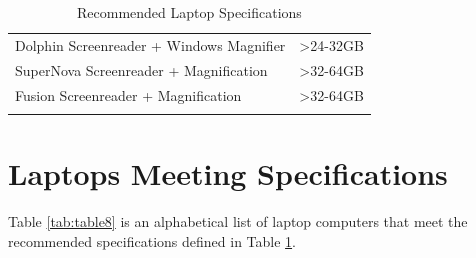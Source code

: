 \begin{longtable}[]{@{}
	>{\raggedright\arraybackslash}m{}
	>{\raggedright\arraybackslash}b{}@{}
	}
	Dolphin Screenreader + Windows Magnifier                                                                                                                                                                                                                                         & \textgreater24-32GB \\[1.0em]
	SuperNova Screenreader + Magnification                                                                                                                                                                                                                                           & \textgreater32-64GB \\[1.0em]
	Fusion Screenreader + Magnification                                                                                                                                                                                                                                              & \textgreater32-64GB \\[1.0em] \hline
	\caption{Recommended Laptop Specifications}\label{tab:table7}
\end{longtable}

\pagebreak
\hypertarget{laptops-meeting-recommended-specifications}{}\section{Laptops Meeting Specifications}\label{laptops-meeting-recommended-specifications}
Table \ref{tab:table8} is an alphabetical list of laptop computers that meet the recommended specifications defined in Table \ref{tab:table7}.

